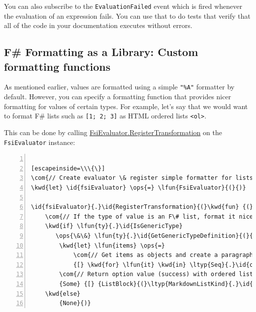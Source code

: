 \documentclass{article}
\newcommand{\id}[1]{\textcolor{black}{#1}}
\newcommand{\com}[1]{\textcolor{officegreen}{#1}}
\newcommand{\kwd}[1]{\textcolor{navy}{#1}}
\newcommand{\ops}[1]{\textcolor{purple}{#1}}
\begin{document}
You can also subscribe to the \texttt{EvaluationFailed} event which is fired whenever the evaluation
of an expression fails. You can use that to do tests that verify that all of the code in your
documentation executes without errors.
\subsection*{F\# Formatting as a Library: Custom formatting functions}



As mentioned earlier, values are formatted using a simple \texttt{"\%A"} formatter by default.
However, you can specify a formatting function that provides nicer formatting for values
of certain types. For example, let's say that we would want to format F\# lists such as
\texttt{[1; 2; 3]} as HTML ordered lists \texttt{<ol>}.


This can be done by calling \href{https://fsprojects.github.io/FSharp.Formatting/reference/fsharp-formatting-literate-evaluation-fsievaluator.html\#RegisterTransformation}{FsiEvaluator.RegisterTransformation} on the \texttt{FsiEvaluator} instance:
\begin{lstlisting}[numbers=left]

[escapeinside=\\\{\}]
\com{// Create evaluator \& register simple formatter for lists}
\kwd{let} \id{fsiEvaluator} \ops{=} \lfun{FsiEvaluator}{(}{)}

\id{fsiEvaluator}{.}\id{RegisterTransformation}{(}\kwd{fun} {(}\lfun{o}{,} \lfun{ty}{,} \id{\_executionCount}{)} \kwd{->}
    \com{// If the type of value is an F\# list, format it nicely}
    \kwd{if} \lfun{ty}{.}\id{IsGenericType}
       \ops{\&\&} \lfun{ty}{.}\id{GetGenericTypeDefinition}{(}{)} \ops{=} \kwd{typedefof}{<}\ltyp{list}{<}\id{\_}{>}{>} \kwd{then}
        \kwd{let} \lfun{items} \ops{=}
            \com{// Get items as objects and create a paragraph for each item}
            {[} \kwd{for} \lfun{it} \kwd{in} \ltyp{Seq}{.}\id{cast}{<}\ltyp{obj}{>} {(}\lfun{unbox} \lfun{o}{)} \kwd{->} {[} {Paragraph}{(}{[} {Literal}{(}\lfun{it}{.}\id{ToString}{(}{)}{,} {None}{)} {]}{,} {None}{)} {]} {]}
        \com{// Return option value (success) with ordered list}
        {Some} {[} {ListBlock}{(}\ltyp{MarkdownListKind}{.}\id{Ordered}{,} \lfun{items}{,} {None}{)} {]}
    \kwd{else}
        {None}{)}

\end{lstlisting}
\end{document}
